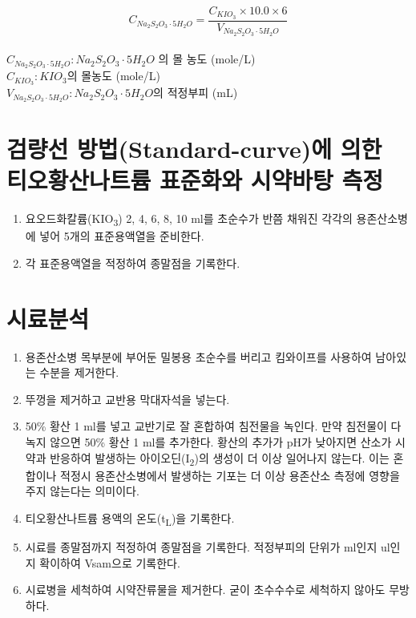\documentclass[
]{book}
\providecommand{\tightlist}{%
  \setlength{\itemsep}{0pt}\setlength{\parskip}{0pt}}
\begin{document}
\[C_{Na_{2}S_{2}O_{3} \cdot 5H_{2}O} = \frac{C_{KIO_3} \times 10.0 \times 6}{V_{Na_{2}S_{2}O_{3} \cdot 5H_{2}O}}\]\\
\(C_{Na_{2}S_{2}O_{3} \cdot 5H_{2}O} : Na_{2}S_{2}O_{3} \cdot 5H_{2}O\) 의 몰 농도 (mole/L)\\
\(C_{KIO_3}: KIO_3\)의 몰농도 (mole/L)\\
\(V_{Na_{2}S_{2}O_{3} \cdot 5H_{2}O}: Na_{2}S_{2}O_{3} \cdot 5H_{2}O\)의 적정부피 (mL)

\hypertarget{uxac80uxb7c9uxc120-uxbc29uxbc95standard-curveuxc5d0-uxc758uxd55c-uxd2f0uxc624uxd669uxc0b0uxb098uxd2b8uxb968-uxd45cuxc900uxd654uxc640-uxc2dcuxc57duxbc14uxd0d5-uxce21uxc815}{%
\section{검량선 방법(Standard-curve)에 의한 티오황산나트륨 표준화와 시약바탕 측정}\label{uxac80uxb7c9uxc120-uxbc29uxbc95standard-curveuxc5d0-uxc758uxd55c-uxd2f0uxc624uxd669uxc0b0uxb098uxd2b8uxb968-uxd45cuxc900uxd654uxc640-uxc2dcuxc57duxbc14uxd0d5-uxce21uxc815}}

\begin{enumerate}
\def\labelenumi{\arabic{enumi}.}
\tightlist
\item
  요오드화칼륨(KIO\textsubscript{3}) 2, 4, 6, 8, 10 ml를 초순수가 반쯤 채워진 각각의 용존산소병에 넣어 5개의 표준용액열을 준비한다.
\item
  각 표준용액열을 적정하여 종말점을 기록한다.
\end{enumerate}

\hypertarget{uxc2dcuxb8ccuxbd84uxc11d-1}{%
\section{시료분석}\label{uxc2dcuxb8ccuxbd84uxc11d-1}}

\begin{enumerate}
\def\labelenumi{\arabic{enumi}.}
\tightlist
\item
  용존산소병 목부분에 부어둔 밀봉용 초순수를 버리고 킴와이프를 사용하여 남아있는 수분을 제거한다.
\item
  뚜껑을 제거하고 교반용 막대자석을 넣는다.
\item
  50\% 황산 1 ml를 넣고 교반기로 잘 혼합하여 침전물을 녹인다. 만약 침전물이 다 녹지 않으면 50\% 황산 1 ml를 추가한다. 황산의 추가가 pH가 낮아지면 산소가 시약과 반응하여 발생하는 아이오딘(I\textsubscript{2})의 생성이 더 이상 일어나지 않는다. 이는 혼합이나 적정시 용존산소병에서 발생하는 기포는 더 이상 용존산소 측정에 영향을 주지 않는다는 의미이다.
\item
  티오황산나트륨 용액의 온도(t\textsubscript{L})을 기록한다.
\item
  시료를 종말점까지 적정하여 종말점을 기록한다. 적정부피의 단위가 ml인지 ul인지 확이하여 Vsam으로 기록한다.
\item
  시료병을 세척하여 시약잔류물을 제거한다. 굳이 초수수수로 세척하지 않아도 무방하다.
\end{enumerate}
\end{document}
